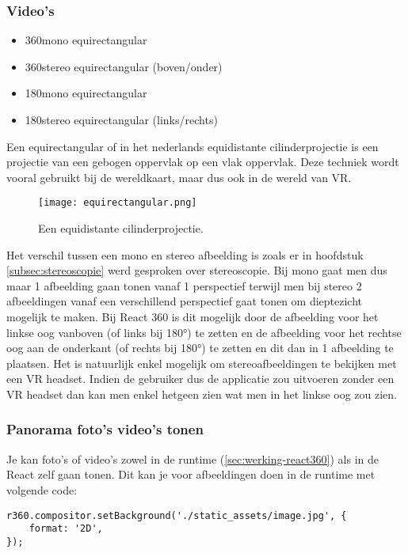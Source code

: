 \subsubsection{Video's}
\begin{itemize}
	\item 360\textdegree mono equirectangular
	\item 360\textdegree stereo equirectangular (boven/onder)
	\item 180\textdegree mono equirectangular
	\item 180\textdegree stereo equirectangular (links/rechts)
\end{itemize}

Een equirectangular of in het nederlands equidistante cilinderprojectie is een projectie van een gebogen oppervlak op een vlak oppervlak. Deze techniek wordt vooral gebruikt bij de wereldkaart, maar dus ook in de wereld van VR. 

\begin{figure}
	\centering
	\texttt{[image: equirectangular.png]}
	\caption{Een equidistante cilinderprojectie.}
	\label{fig:eq-cilinder}
\end{figure}

Het verschil tussen een mono en stereo afbeelding is zoals er in hoofdstuk \ref{subsec:stereoscopie} werd gesproken over stereoscopie. Bij mono gaat men dus maar 1 afbeelding gaan tonen vanaf 1 perspectief terwijl men bij stereo 2 afbeeldingen vanaf een verschillend perspectief gaat tonen om dieptezicht mogelijk te maken. Bij React 360 is dit mogelijk door de afbeelding voor het linkse oog vanboven (of links bij 180°) te zetten en de afbeelding voor het rechtse oog aan de onderkant (of rechts bij 180°) te zetten en dit dan in 1 afbeelding te plaatsen. Het is natuurlijk enkel mogelijk om stereoafbeeldingen te bekijken met een VR headset. Indien de gebruiker dus de applicatie zou uitvoeren zonder een VR headset dan kan men enkel hetgeen zien wat men in het linkse oog zou zien.

\subsubsection{Panorama foto's video's tonen}
Je kan foto's of video's zowel in de runtime (\ref{sec:werking-react360}) als in de React zelf gaan tonen. Dit kan je voor afbeeldingen doen in de runtime met volgende code:

\begin{lstlisting}[frame=single, caption=Een afbeelding als achtergrond instellen in de runtime.]
r360.compositor.setBackground('./static_assets/image.jpg', {
	format: '2D',
});
\end{lstlisting}


